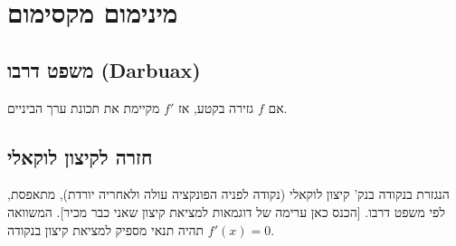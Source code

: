\documentclass[]{article}
\begin{document}
	\section{מינימום מקסימום}
	
	\subsection{משפט דרבו (Darbuax)}
	אם $f$ גזירה בקטע, אז $f'$ מקיימת את תכונת ערך הביניים. 
	\subsection{חזרה לקיצון לוקאלי}
	הנגזרת בנקודה בנק' קיצון לוקאלי (נקודה לפניה הפונקציה עולה ולאחריה יורדת), מתאפסת, לפי משפט דרבו. [הכנס כאן ערימה של דוגמאות למציאת קיצון שאני כבר מכיר]. המשוואה $f'(x) = 0$ תהיה תנאי מספיק למציאת קיצון בנקודה. 
	
\end{document}
